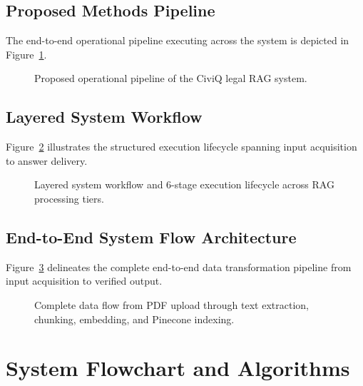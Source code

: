 \documentclass[12pt,a4paper]{report}
\begin{document}
\subsection{Proposed Methods Pipeline}
The end-to-end operational pipeline executing across the system is depicted in Figure~\ref{fig:framework}.

\begin{figure}[H]
    \centering
    \caption{Proposed operational pipeline of the CiviQ legal RAG system.}
    \label{fig:framework}
\end{figure}

\subsection{Layered System Workflow}
Figure~\ref{fig:arch_workflow} illustrates the structured execution lifecycle spanning input acquisition to answer delivery.

\begin{figure}[H]
    \centering
    \caption{Layered system workflow and 6-stage execution lifecycle across RAG processing tiers.}
    \label{fig:arch_workflow}
\end{figure}

\subsection{End-to-End System Flow Architecture}
Figure~\ref{fig:system_flow} delineates the complete end-to-end data transformation pipeline from input acquisition to verified output.

\begin{figure}[H]
    \centering
    \caption{Complete data flow from PDF upload through text extraction, chunking, embedding, and Pinecone indexing.}
    \label{fig:system_flow}
\end{figure}

\section{System Flowchart and Algorithms}
\end{document}
